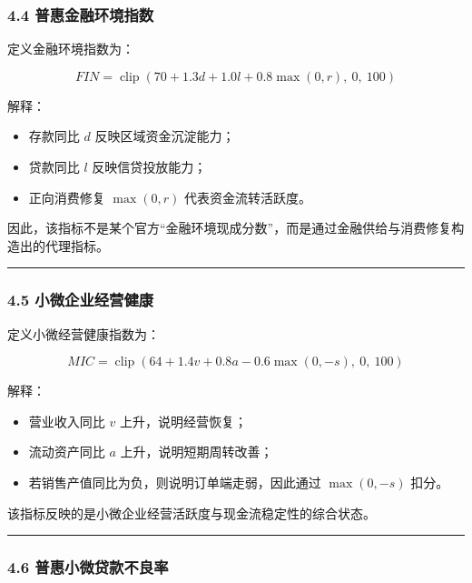 \documentclass[
]{article}
\providecommand{\tightlist}{%
  \setlength{\itemsep}{0pt}\setlength{\parskip}{0pt}}
\begin{document}
\subsubsection{4.4
普惠金融环境指数}\label{ux666eux60e0ux91d1ux878dux73afux5883ux6307ux6570}

定义金融环境指数为：

\[
FIN = \operatorname{clip}\left(70 + 1.3d + 1.0l + 0.8\max(0,r),\ 0,\ 100\right)
\]

解释：

\begin{itemize}
\tightlist
\item
  存款同比 \(d\) 反映区域资金沉淀能力；
\item
  贷款同比 \(l\) 反映信贷投放能力；
\item
  正向消费修复 \(\max(0,r)\) 代表资金流转活跃度。
\end{itemize}

因此，该指标不是某个官方``金融环境现成分数''，而是通过金融供给与消费修复构造出的代理指标。

\begin{center}\rule{0.5\linewidth}{0.5pt}\end{center}

\subsubsection{4.5
小微企业经营健康}\label{ux5c0fux5faeux4f01ux4e1aux7ecfux8425ux5065ux5eb7}

定义小微经营健康指数为：

\[
MIC = \operatorname{clip}\left(64 + 1.4v + 0.8a - 0.6\max(0,-s),\ 0,\ 100\right)
\]

解释：

\begin{itemize}
\tightlist
\item
  营业收入同比 \(v\) 上升，说明经营恢复；
\item
  流动资产同比 \(a\) 上升，说明短期周转改善；
\item
  若销售产值同比为负，则说明订单端走弱，因此通过 \(\max(0,-s)\) 扣分。
\end{itemize}

该指标反映的是小微企业经营活跃度与现金流稳定性的综合状态。

\begin{center}\rule{0.5\linewidth}{0.5pt}\end{center}

\subsubsection{4.6
普惠小微贷款不良率}\label{ux666eux60e0ux5c0fux5faeux8d37ux6b3eux4e0dux826fux7387}
\end{document}

